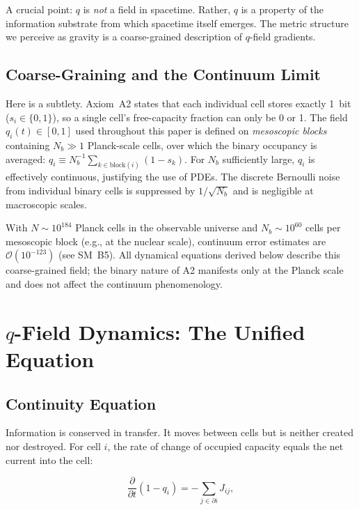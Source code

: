 \documentclass[aps,prd,twocolumn,showpacs,superscriptaddress,preprintnumbers]{revtex4-2}
\begin{document}
A crucial point: $q$ is \emph{not} a field in spacetime.
Rather, $q$ is a property of the information substrate from which spacetime itself emerges.
The metric structure we perceive as gravity is a coarse-grained description of $q$-field gradients.

\subsection{Coarse-Graining and the Continuum Limit}

Here is a subtlety.
Axiom~A2 states that each individual cell stores exactly 1~bit ($s_i\in\{0,1\}$), so a single cell's free-capacity fraction can only be 0 or 1.
The field $q_i(t)\in[0,1]$ used throughout this paper is defined on \emph{mesoscopic blocks} containing $N_b\gg 1$ Planck-scale cells, over which the binary occupancy is averaged:
$q_i \equiv N_b^{-1}\sum_{k\in\text{block}(i)}(1-s_k)$.
For $N_b$ sufficiently large, $q_i$ is effectively continuous, justifying the use of PDEs.
The discrete Bernoulli noise from individual binary cells is suppressed by $1/\sqrt{N_b}$ and is negligible at macroscopic scales.

With $N\sim10^{184}$ Planck cells in the observable universe and $N_b\sim10^{60}$ cells per mesoscopic block (e.g., at the nuclear scale), continuum error estimates are $\mathcal{O}(10^{-123})$ (see SM~B5).
All dynamical equations derived below describe this coarse-grained field; the binary nature of A2 manifests only at the Planck scale and does not affect the continuum phenomenology.

\section{$q$-Field Dynamics: The Unified Equation}
\label{sec:dynamics}

\subsection{Continuity Equation}

Information is conserved in transfer. It moves between cells but is neither created nor destroyed.
For cell $i$, the rate of change of occupied capacity equals the net current into the cell:

\begin{equation}
\frac{\partial}{\partial t}(1 - q_i) = -\sum_{j \in \partial i} J_{ij},
\label{eq:continuity_raw}
\end{equation}
\end{document}
